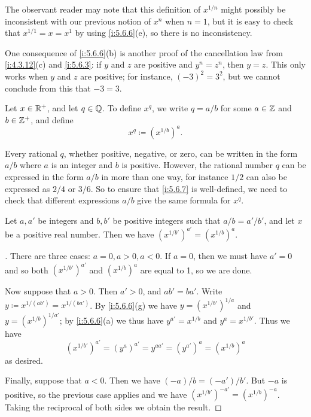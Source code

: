 \begin{note}
  The observant reader may note that this definition of \(x^{1 / n}\) might possibly be inconsistent with our previous notion of \(x^n\) when \(n = 1\), but it is easy to check that \(x^{1 / 1} = x = x^1\) by using \cref{i:5.6.6}(e), so there is no inconsistency.
\end{note}

\begin{note}
  One consequence of \cref{i:5.6.6}(b) is another proof of the cancellation law from \cref{i:4.3.12}(c) and \cref{i:5.6.3}:
  if \(y\) and \(z\) are positive and \(y^n = z^n\), then \(y = z\).
  This only works when \(y\) and \(z\) are positive;
  for instance, \((-3)^2 = 3^2\), but we cannot conclude from this that \(-3 = 3\).
\end{note}

\begin{defn}\label{i:5.6.7}
  Let \(x \in \mathbb{R}^+\), and let \(q \in \mathbb{Q}\).
  To define \(x^q\), we write \(q = a / b\) for some \(a \in \mathbb{Z}\) and \(b \in \mathbb{Z}^+\), and define
  \[
    x^q \coloneqq (x^{1 / b})^a.
  \]
\end{defn}

\begin{note}
  Every rational \(q\), whether positive, negative, or zero, can be written in the form \(a / b\) where \(a\) is an integer and \(b\) is positive.
  However, the rational number \(q\) can be expressed in the form \(a / b\) in more than one way, for instance \(1 / 2\) can also be expressed as \(2 / 4\) or \(3 / 6\).
  So to ensure that \cref{i:5.6.7} is well-defined, we need to check that different expressions \(a / b\) give the same formula for \(x^q\).
\end{note}

\begin{lem}\label{i:5.6.8}
  Let \(a, a'\) be integers and \(b, b'\) be positive integers such that \(a / b = a' / b'\), and let \(x\) be a positive real number.
  Then we have \((x^{1 / b'})^{a'} = (x^{1 / b})^a\).
\end{lem}

\begin{proof}[]
  There are three cases: \(a = 0, a > 0, a < 0\).
  If \(a = 0\), then we must have \(a' = 0\) and so both \((x^{1 / b'})^{a'}\) and \((x^{1 / b})^a\) are equal to 1, so we are done.

  Now suppose that \(a > 0\).
  Then \(a' > 0\), and \(ab' = ba'\).
  Write \(y \coloneqq x^{1 / (ab')} = x^{1 / (ba')}\).
  By \cref{i:5.6.6}(g) we have \(y = (x^{1 / b'})^{1 / a}\) and \(y = (x^{1 / b})^{1 / a'}\);
  by \cref{i:5.6.6}(a) we thus have \(y^{a'} = x^{1 / b}\) and \(y^a = x^{1 / b'}\).
  Thus we have
  \[
    (x^{1 / b'})^{a'} = (y^a)^{a'} = y^{aa'} = (y^{a'})^a = (x^{1 / b})^a
  \]
  as desired.

  Finally, suppose that \(a < 0\).
  Then we have \((-a) / b = (-a') / b'\).
  But \(-a\) is positive, so the previous case applies and we have \((x^{1 / b'})^{-a'} = (x^{1 / b})^{-a}\).
  Taking the reciprocal of both sides we obtain the result.
\end{proof}

